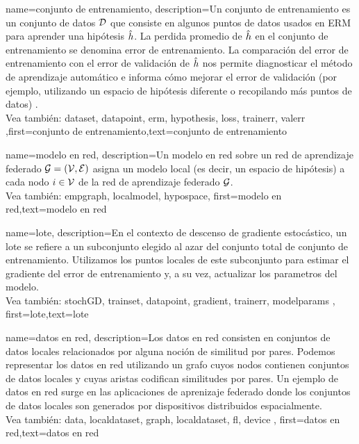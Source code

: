  {name={conjunto de entrenamiento},
 description={Un conjunto de entrenamiento es un conjunto de datos $\mathcal{D}$ que consiste en algunos puntos de datos usados en ERM
	 para aprender una hipótesis $\hat{h}$. La perdida promedio de $\hat{h}$ en el 
	 conjunto de entrenamiento se denomina error de entrenamiento.  La comparación del error de entrenamiento con el 
	 error de validación de $\hat{h}$ nos permite diagnosticar el método de aprendizaje automático e informa cómo mejorar 
	 el error de validación (por ejemplo, utilizando un espacio de hipótesis diferente o recopilando más puntos de datos) \cite[Sec. 6.6]{MLBasics}.
	 \\
	 Vea también: \gls{dataset}, \gls{datapoint}, \gls{erm}, \gls{hypothesis}, \gls{loss}, \gls{trainerr}, \gls{valerr}}
	 ,first={conjunto de entrenamiento},text={conjunto de entrenamiento}  
 }
 
 {name={modelo en red},
   description={Un modelo en red sobre un red de aprendizaje federado $\mathcal{G} = \left( \mathcal{V},\mathcal{E} \right)$ asigna 
	un modelo local (es decir, un espacio de hipótesis) a cada nodo $i \in \mathcal{V}$ de la red de aprendizaje federado $\mathcal{G}$.
	\\
	 Vea también: \gls{empgraph}, \gls{localmodel}, \gls{hypospace}}, 
	first={modelo en red},text={modelo en red}
 }

 {
	 name={lote},
	 description={En el contexto de descenso de gradiente estocástico, un lote se refiere a un subconjunto elegido al azar del 
	 conjunto total de conjunto de entrenamiento. Utilizamos los puntos locales de este subconjunto 
	 para estimar el gradiente del error de entrenamiento y, a su vez, actualizar los parametros del modelo.
	 \\
	 Vea también: \gls{stochGD}, \gls{trainset}, \gls{datapoint}, \gls{gradient}, \gls{trainerr}, \glspl{modelparam} }, 
	 first={lote},text={lote}  
 }
 
 {
	 name={datos en red},
	 description={Los datos en red consisten en conjuntos de datos locales 
	 relacionados por alguna noción de similitud por pares. Podemos representar los datos en red 
	 utilizando un grafo cuyos nodos contienen conjuntos de datos locales y cuyas aristas codifican 
	 similitudes por pares. Un ejemplo de datos en red surge en las aplicaciones de aprenizaje federado
	 donde los conjuntos de datos locales son generados por dispositivos distribuidos espacialmente.
	 \\
	 Vea también: \gls{data}, \gls{localdataset}, \gls{graph}, \gls{localdataset}, \gls{fl}, \gls{device} }, 
	 first={datos en red},text={datos en red}  
 }
 
